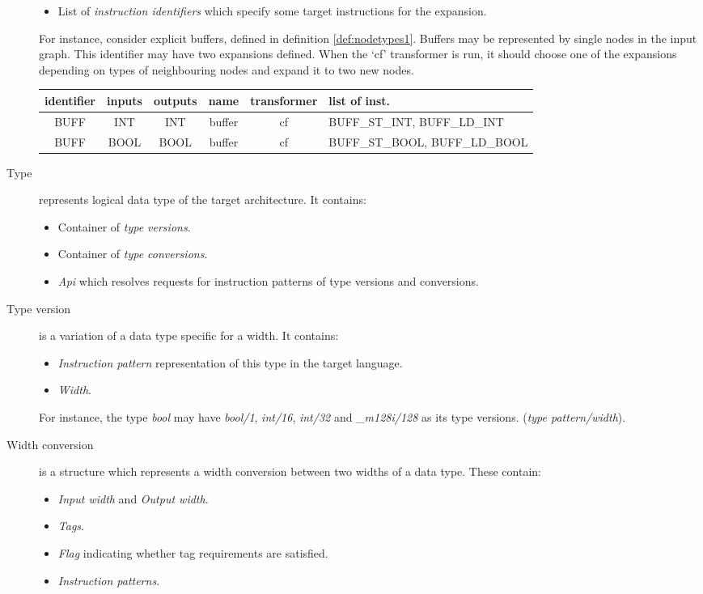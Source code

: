\begin{description}
\begin{itemize}
      \item List of \emph{instruction identifiers} which specify some target instructions for the expansion.
    \end{itemize}
    For instance, consider explicit buffers, defined in definition \ref{def:nodetypes1}. Buffers may be represented by single nodes in the input graph. This identifier may have two expansions defined. When the `cf' transformer is run, it should choose one of the expansions depending on types of neighbouring nodes and expand it to two new nodes.
    \mybeginfig
    \begin{center}
      \begin{tabular}{c|c|c|c|c|p{4cm}}
        identifier & inputs & outputs & name & transformer & list of inst.\\
        \hline
        BUFF & INT & INT & buffer & cf & BUFF\_ST\_INT, BUFF\_LD\_INT \\
        BUFF & BOOL & BOOL & buffer & cf & BUFF\_ST\_BOOL, BUFF\_LD\_BOOL 
      \end{tabular}
    \end{center}
  \item[Type] represents logical data type of the target architecture. It contains:
    \begin{itemize}
      \item Container of \emph{type versions}.
      \item Container of \emph{type conversions}.
      \item \emph{Api} which resolves requests for instruction patterns of type versions and conversions.
    \end{itemize}
  \item[Type version] is a variation of a data type specific for a width. It contains:
    \begin{itemize}
      \item \emph{Instruction pattern} representation of this type in the target language.
      \item \emph{Width}.
    \end{itemize}
    For instance, the type \emph{bool} may have \emph{bool/1}, \emph{int/16}, \emph{int/32} and \emph{\_m128i/128}  as its type versions. (\emph{type pattern/width}).
  \item[Width conversion] is a structure which represents a width conversion between two widths of a data type. These contain:
    \begin{itemize}
      \item \emph{Input width} and \emph{Output width}.
      \item \emph{Tags}.
      \item \emph{Flag} indicating whether tag requirements are satisfied.
      \item \emph{Instruction patterns}.
    \end{itemize}
\end{description}

